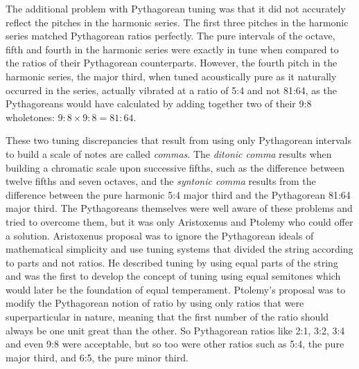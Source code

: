 The additional problem with Pythagorean tuning was that it did not accurately reflect the
pitches in the harmonic series.
The first three pitches in the harmonic series matched Pythagorean ratios perfectly.  The
pure intervals of the octave, fifth and fourth in the harmonic series were exactly in tune
when compared to the ratios of their Pythagorean counterparts. However, the fourth pitch
in the harmonic series, the major third, when tuned acoustically pure as it naturally
occurred in the series, actually vibrated at a ratio of 5:4 and not 81:64, as the
Pythagoreans would have calculated by adding together two of their 9:8 wholetones: $ 9:8
\times 9:8 = 81:64 $.

These two tuning discrepancies that result from using only Pythagorean intervals to build
a scale of notes are called \textit{commas}.  The \textit{ditonic comma} results when
building a chromatic scale upon successive fifths, such as the difference between twelve
fifths and seven octaves, and the \textit{syntonic comma} results from the difference
between the pure harmonic 5:4 major third and the Pythagorean 81:64 major third.  The
Pythagoreans themselves were well aware of these problems and tried to overcome them, but
it was only Aristoxenus and Ptolemy who could offer a solution. Aristoxenus
proposal was to ignore the Pythagorean ideals of mathematical simplicity and use
tuning systems that divided the string according to parts and not ratios.  He described
tuning by using equal parts of the string and was the first to develop the concept of
tuning using equal semitones which would later be the foundation of equal temperament.
Ptolemy's proposal was to modify the Pythagorean notion of ratio by using only ratios that were
superparticular in nature, meaning that the first number of the ratio should always be one
unit great than the other.  So Pythagorean ratios like 2:1, 3:2, 3:4 and even 9:8 were
acceptable, but so too were other ratios such as 5:4, the pure major third, and 6:5, the
pure minor third.

